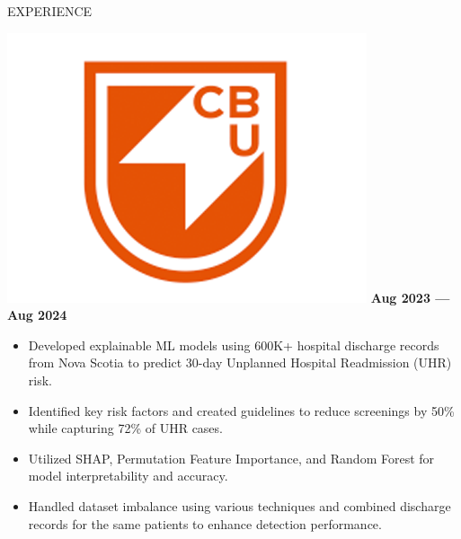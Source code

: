 \documentclass{resume} %
\begin{document}
\vspace{-0.4cm}
\begin{rSection}{EXPERIENCE}




\includegraphics[height=3\fontcharht\font`\B]{cbu_logo.png}%
 \hfill \textbf{Aug 2023 --- Aug 2024}\vspace{-0.2cm}


\begin{itemize}
    \item Developed explainable ML models using 600K+ hospital discharge records from Nova Scotia to predict 30-day Unplanned Hospital Readmission (UHR) risk. \vspace{-0.2cm}
    \item Identified key risk factors and created guidelines to reduce screenings by 50\% while capturing 72\% of UHR cases.\vspace{-0.2cm}
    \item Utilized SHAP, Permutation Feature Importance, and Random Forest for model interpretability and accuracy.\vspace{-0.2cm}
    \item Handled dataset imbalance using various techniques and combined discharge records for the same patients to
    enhance detection performance.
\end{itemize}


\end{rSection}
\end{document}
